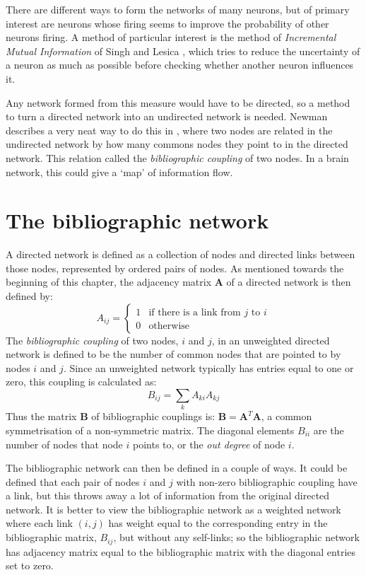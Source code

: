 There are different ways to form the networks of many neurons, but of primary interest are neurons whose firing seems to improve the probability of other neurons 
firing.  A method of particular interest is the method of 
\emph{Incremental Mutual Information} of Singh and Lesica 
\citep{SinghLesica2010a}, which tries to reduce the uncertainty of a neuron as 
much as possible before checking whether another neuron influences it.

Any network formed from this measure would have to be directed, so a 
method to turn a directed network into an undirected network is needed.  Newman describes 
a very neat way to do this in \citep{Newman2010a}, where two nodes are related 
in the undirected network by how many commons nodes they point to in the 
directed network.  This relation called the {\sl bibliographic coupling} of two 
nodes.  In a brain network, this could give a \lq{}map\rq{} of information flow.

\section{The bibliographic network}
A directed network is defined as a collection of nodes and directed links between those nodes, represented by ordered pairs of nodes.  As mentioned towards the beginning of this chapter, the adjacency matrix $\mathbf{A}$ of a directed network is then defined by:
\begin{equation}
A_{ij} = \left\{ \begin{array}{ll} 1 & \text{if there is a link from $j$ to $i$} \\ 0 & \text{otherwise} \end{array}\right.
\end{equation}
The \emph{bibliographic coupling} of two nodes, $i$ and $j$, in an unweighted directed network is defined to be the number of common nodes that are pointed to by nodes $i$ and $j$.  Since an unweighted network typically has entries equal to one or zero, this coupling is calculated as:
\begin{equation}
B_{ij} = \sum_k A_{ki} A_{kj}
\end{equation}
Thus the matrix $\mathbf{B}$ of bibliographic couplings is: $\mathbf{B} = \mathbf{A}^T\mathbf{A}$, a common symmetrisation of a non-symmetric matrix.  The diagonal elements $B_{ii}$ are the number of nodes that node $i$ points to, or the \emph{out degree} of node $i$.

The bibliographic network can then be defined in a couple of ways.  It could be defined that each pair of nodes $i$ and $j$ with non-zero bibliographic coupling have a link, but this throws away a lot of information from the original directed network.  It is better to view the bibliographic network as a weighted network where each link $(i,j)$ has weight equal to the corresponding entry in the bibliographic matrix, $B_{ij}$, but without any self-links; so the bibliographic network has adjacency matrix equal to the bibliographic matrix with the diagonal entries set to zero.

